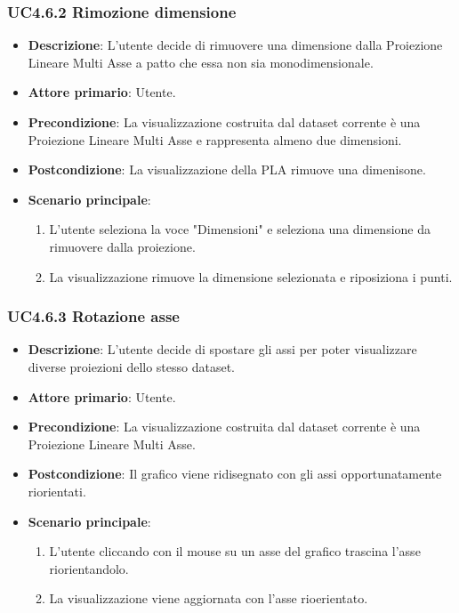 \subsubsection{UC4.6.2 Rimozione dimensione}
\label{ssub:uc4.6.2}
\begin{itemize}
    \item \textbf{Descrizione}: L’utente decide di rimuovere una dimensione dalla Proiezione Lineare Multi Asse
                                a patto che essa non sia monodimensionale.

    \item \textbf{Attore primario}: Utente.
    
    \item \textbf{Precondizione}:   La visualizzazione costruita dal dataset corrente è una Proiezione Lineare Multi Asse
                                    e rappresenta almeno due dimensioni.
    \item \textbf{Postcondizione}:  La visualizzazione della PLA rimuove una dimenisone.

	\item \textbf{Scenario principale}:
        \begin{enumerate}
            \item L'utente seleziona la voce "Dimensioni" e seleziona una dimensione da rimuovere dalla proiezione.
            \item La visualizzazione rimuove la dimensione selezionata e riposiziona i punti.
           
        \end{enumerate}
\end{itemize}

\subsubsection{UC4.6.3 Rotazione asse}
\label{ssub:uc4.6.3}
\begin{itemize}
    \item \textbf{Descrizione}: L'utente decide di spostare gli assi per poter visualizzare diverse proiezioni dello stesso dataset.
    \item \textbf{Attore primario}: Utente.
    \item \textbf{Precondizione}: La visualizzazione costruita dal dataset corrente è una Proiezione Lineare Multi Asse.
    \item \textbf{Postcondizione}: Il grafico viene ridisegnato con gli assi opportunatamente riorientati.
    \item \textbf{Scenario principale}:
    \begin{enumerate}
        \item L'utente cliccando con il mouse su un asse del grafico trascina l'asse riorientandolo.
	\item La visualizzazione viene aggiornata con l'asse rioerientato.
    \end{enumerate}
\end{itemize}

